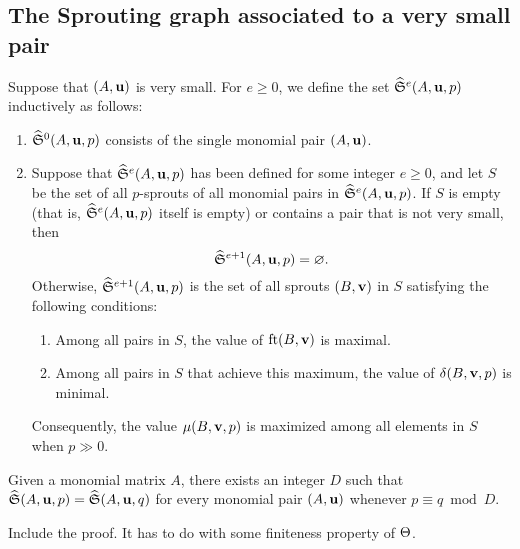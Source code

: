 \documentclass[11pt]{amsart}
\begin{document}
\subsection{The Sprouting graph associated to a very small pair}
\begin{definition}
   Suppose that $(A, \mathbf{u})$ is very small.
   For $e \geq 0$, we define the set $\widehat{\mathfrak{S}}^e(A,\mathbf{u},p)$ inductively as follows:
\begin{enumerate}
\item $\widehat{\mathfrak{S}}^0(A, \mathbf{u}, p)$ consists of the single monomial pair $(A, \mathbf{u})$.
\item Suppose that $\widehat{\mathfrak{S}}^e(A, \mathbf{u}, p)$ has been defined for some integer $e \geq 0$, and let $S$ be the set of all $p$-sprouts of all monomial pairs in $\widehat{\mathfrak{S}}^e(A, \mathbf{u}, p)$.
If  $S$ is empty (that is, $\widehat{\mathfrak{S}}^e(A, \mathbf{u}, p)$ itself is empty) or contains a pair that is not very small, then \[ \widehat{\mathfrak{S}}^{e+1}(A, \mathbf{u}, p) = \varnothing.\]
Otherwise, $\widehat{\mathfrak{S}}^{e+1}(A, \mathbf{u}, p)$ is the set of all sprouts $(B, \mathbf{v})$ in $S$ satisfying the following conditions:

\begin{enumerate}
\item Among all pairs in $S$, the value of  $\operatorname{ft}(B, \mathbf{v})$ is maximal.
\item Among all pairs in $S$ that achieve this maximum, the value of $\delta(B, \mathbf{v}, p)$ is minimal.
\end{enumerate}
Consequently, the value $\mu(B, \mathbf{v},p)$ is maximized among all elements in $S$ when $p \gg 0$.
\end{enumerate}
\end{definition}


\begin{proposition}
   Given a monomial matrix $A$, there exists an integer $D$ such that $\widehat{\mathfrak{S}}(A, \mathbf{u}, p) = \widehat{\mathfrak{S}}(A, \mathbf{u}, q)$ for every monomial pair $(A, \mathbf{u})$ whenever $p \equiv q \bmod D$.
\end{proposition}

\alert[inline]{Include the proof.  It has to do with some finiteness property of $\Theta$.}


\end{document}
